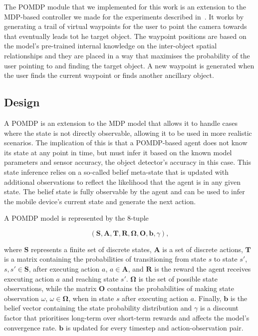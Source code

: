 \documentclass[runningheads]{llncs}
\begin{document}
The POMDP module that we implemented for this work is an extension to the MDP-based controller we made for the experiments described in~\cite{lock2019active}.
It works by generating a trail of virtual waypoints for the user to point the camera towards that eventually leads tot he target object.
The waypoint positions are based on the model's pre-trained internal knowledge on the inter-object spatial relationships and they are placed in a way that maximises the probability of the user pointing to and finding the target object.
A new waypoint is generated when the user finds the current waypoint or finds another ancillary object.

\subsection{Design}

A POMDP is an extension to the MDP model that allows it to handle cases where the state is not directly observable, allowing it to be used in more realistic scenarios. 
The implication of this is that a POMDP-based agent does not know its state at any point in time, but must infer it based on the known model parameters and sensor accuracy, the object detector's accuracy in this case.
This state inference relies on a so-called belief meta-state that is updated with additional observations to reflect the likelihood that the agent is in any given state.
The belief state is fully observable by the agent and can be used to infer the mobile device's current state and generate the next action.

A POMDP model is represented by the $8$-tuple

\begin{equation}
  (\mathbf{S}, \mathbf{A}, \mathbf{T}, \mathbf{R}, \mathbf{\Omega}, \mathbf{O}, \mathbf{b}, \gamma),
\end{equation}

\noindent where $\mathbf{S}$ represents a finite set of discrete states, $\mathbf{A}$ is a set of discrete actions, $\mathbf{T}$ is a matrix containing the probabilities of transitioning from state $s$ to state $s'$, $s, s' \in \mathbf{S}$, after executing action $a$, $a \in \mathbf{A}$, and $\mathbf{R}$ is the reward the agent receives executing action $a$ and reaching state $s'$.
$\mathbf{\Omega}$ is the set of possible state observations, while the matrix $\mathbf{O}$ contains the probabilities of making state observation $\omega$, $\omega \in \mathbf{\Omega}$, when in state $s$ after executing action $a$.
Finally, $\mathbf{b}$ is the belief vector containing the state probability distribution and $\gamma$ is a discount factor that prioritises long-term over short-term rewards and affects the model's convergence rate. 
$\mathbf{b}$ is updated for every timestep and action-observation pair.
\end{document}
